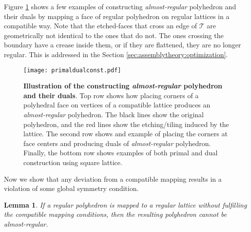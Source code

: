 \documentclass[11pt]{article}
\newtheorem{lemma}[thm]{Lemma}
\newcommand{\1}{\mathds{1}}
\begin{document}
Figure \ref{fig:assemblytheory:primaldualconst} shows a few examples of constructing \emph{almost-regular} polyhedron and their duals by mapping a face of regular polyhedron on regular lattices in a compatible way. Note that the etched-faces that cross an edge of $\mathcal{T}$ are geometrically not identical to the ones that do not. The ones crossing the boundary have a crease inside them, or if they are flattened, they are no longer regular. This is addressed in the Section \ref{sec:assemblytheory:optimization}.

\begin{figure}[h!]
\centering
\texttt{[image: primaldualconst.pdf]}
\caption[Illustration of the constructing \emph{almost-regular} polyhedron and their duals]{ \textbf{Illustration of the constructing \emph{almost-regular} polyhedron and their duals}. Top row shows how placing corners of a polyhedral face on vertices of a compatible lattice produces an \emph{almost-regular} polyhedron. The black lines show the original polyhedron, and the red lines show the etching/tiling induced by the lattice. The second row shows and example of placing the corners at face centers and producing duals of \emph{almost-regular} polyhedron. Finally, the bottom row shows examples of both primal and dual construction using square lattice.}
\label{fig:assemblytheory:primaldualconst}
\end{figure}


Now we show that any deviation from a compatible mapping results in a violation of some global symmetry condition.

\begin{lemma}
\label{lemma:assemblytheory:necessary1}
 If a regular polyhedron is mapped to a regular lattice without fulfilling the compatible mapping conditions, then the resulting polyhedron cannot be \emph{almost-regular}.
\end{lemma}
\end{document}
